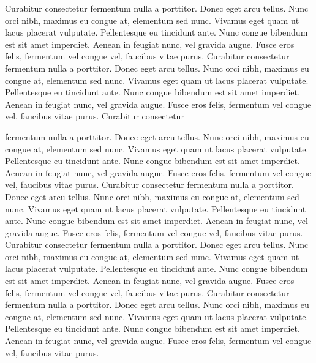 \documentclass[]{aleph-notas-test}
\begin{document}
Curabitur consectetur fermentum nulla a porttitor. Donec eget arcu tellus. Nunc orci nibh, maximus eu congue at, elementum sed nunc. Vivamus eget quam ut lacus placerat vulputate. Pellentesque eu tincidunt ante. Nunc congue bibendum est sit amet imperdiet. Aenean in feugiat nunc, vel gravida augue. Fusce eros felis, fermentum vel congue vel, faucibus vitae purus.
Curabitur consectetur fermentum nulla a porttitor. Donec eget arcu tellus. Nunc orci nibh, maximus eu congue at, elementum sed nunc. Vivamus eget quam ut lacus placerat vulputate. Pellentesque eu tincidunt ante. Nunc congue bibendum est sit amet imperdiet. Aenean in feugiat nunc, vel gravida augue. Fusce eros felis, fermentum vel congue vel, faucibus vitae purus.
Curabitur consectetur 

fermentum nulla a porttitor. Donec eget arcu tellus. Nunc orci nibh, maximus eu congue at, elementum sed nunc. Vivamus eget quam ut lacus placerat vulputate. Pellentesque eu tincidunt ante. Nunc congue bibendum est sit amet imperdiet. Aenean in feugiat nunc, vel gravida augue. Fusce eros felis, fermentum vel congue vel, faucibus vitae purus.
Curabitur consectetur fermentum nulla a porttitor. Donec eget arcu tellus. Nunc orci nibh, maximus eu congue at, elementum sed nunc. Vivamus eget quam ut lacus placerat vulputate. Pellentesque eu tincidunt ante. Nunc congue bibendum est sit amet imperdiet. Aenean in feugiat nunc, vel gravida augue. Fusce eros felis, fermentum vel congue vel, faucibus vitae purus.
Curabitur consectetur fermentum nulla a porttitor. Donec eget arcu tellus. Nunc orci nibh, maximus eu congue at, elementum sed nunc. Vivamus eget quam ut lacus placerat vulputate. Pellentesque eu tincidunt ante. Nunc congue bibendum est sit amet imperdiet. Aenean in feugiat nunc, vel gravida augue. Fusce eros felis, fermentum vel congue vel, faucibus vitae purus.
Curabitur consectetur fermentum nulla a porttitor. Donec eget arcu tellus. Nunc orci nibh, maximus eu congue at, elementum sed nunc. Vivamus eget quam ut lacus placerat vulputate. Pellentesque eu tincidunt ante. Nunc congue bibendum est sit amet imperdiet. Aenean in feugiat nunc, vel gravida augue. Fusce eros felis, fermentum vel congue vel, faucibus vitae purus.
\end{document}
